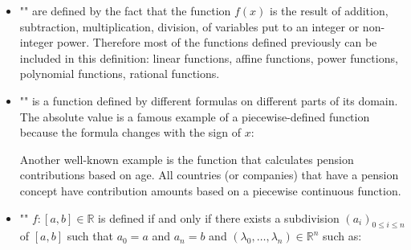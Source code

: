 \begin{enumerate}
\begin{itemize}
			 \item "" are defined by the fact that the function $f(x)$ is the result of addition, subtraction, multiplication, division, of variables put to an integer or non-integer power. Therefore most of the functions defined previously can be included in this definition: linear functions, affine functions, power functions, polynomial functions, rational functions.
			 
			 \item "" is a function defined by different formulas on different parts of its domain. The absolute value is a famous example of a piecewise-defined function because the formula changes with the sign of $x$:
			 
			Another well-known example is the function that calculates pension contributions based on age. All countries (or companies) that have a pension concept have contribution amounts based on a piecewise continuous function.
			 
			 \item "" $f:[a,b]\in \mathbb{R}$ is defined if and only if there exists a subdivision $(a_i)_{0\leq i \leq n}$ of $[a, b]$ such that $a_0=a$ and $a_n=b$ and $(\lambda_0,\ldots ,\lambda_n)\in \mathbb{R}^n$ such as:
			 
			\begin{figure}[H]
				\centering
				\begin{tikzpicture}[x=0.75pt,y=0.75pt,yscale=-1,xscale=1]
				

\end{tikzpicture}
\end{figure}
\end{itemize}
\end{enumerate}
